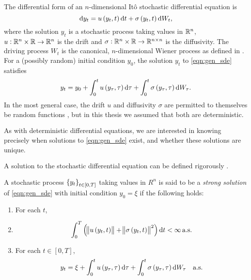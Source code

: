 \begin{definition}\label{def:wiener}

\end{definition}


The differential form of an \(n\)-dimensional It\^o stochastic differential equation is
\begin{equation}
	\dif y_t = u\left(y_t, t\right)\dif t + \sigma\left(y_t, t\right)\dif W_t,
	\label{eqn:gen_sde}
\end{equation}
where the solution \(y_t\) is a stochastic process taking values in \(\mathbb{R}^n\), \(u: \mathbb{R}^n \times \mathbb{R} \to \mathbb{R}^n\) is the drift and \(\sigma: \mathbb{R}^n \times \mathbb{R} \to \mathbb{R}^{n\times n}\) is the diffusivity.
The driving process \(W_t\) is the canonical, \(n\)-dimensional Wiener process as defined in .
For a (possibly random) initial condition \(y_0\), the solution \(y_t\) to \eqref{eqn:gen_sde} satisfies
\begin{equation}
	y_t = y_0 + \int_0^t{u\left(y_\tau, \tau\right)\dif\tau} + \int_0^t{\sigma\left(y_\tau, \tau\right)\dif W_\tau}.
	\label{eqn:gen_sde_int}
\end{equation}
In the most general case, the drift \(u\) and diffusivity \(\sigma\) are permitted to themselves be random functions \cite{KallianpurSundar_2014_StochasticAnalysisDiffusion}, but in this thesis we assumed that both are deterministic.

As with deterministic differential equations, we are interested in knowing precisely when solutions to \eqref{eqn:gen_sde} exist, and whether these solutions are unique.

A solution to the stochastic differential equation can be defined rigorously \cite{KallianpurSundar_2014_StochasticAnalysisDiffusion}.
\begin{definition}
	A stochastic process \(\set{y_t}_{t \in [0,T]}\) taking values in \(R^n\) is said to be a \emph{strong solution} of \eqref{eqn:gen_sde} with initial condition \(y_0 = \xi\) if the following holds:
	\begin{enumerate}
		\item For each \(t\),
		\item
		      \[
			      \int_0^T{\left(\norm{u\left(y_t, t\right)} + \norm{\sigma\left(y_t, t\right)}^2\right)\dif t} < \infty \alsu
		      \]

		\item For each \(t \in [0,T]\),
		      \[
			      y_t = \xi + \int_0^t{u\left(y_\tau, \tau\right)\dif\tau} + \int_0^t{\sigma\left(y_\tau, \tau\right)\dif W_\tau} \quad \text{a.s.}
		      \]
	\end{enumerate}
\end{definition}

